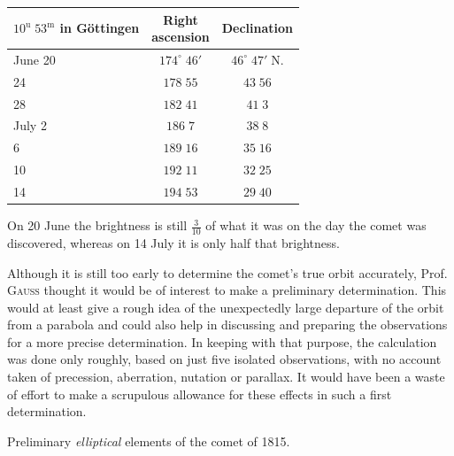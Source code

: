 \begin{center}\fontsize{10}{12}\selectfont\setlength{\tabcolsep}{5pt}\renewcommand{\arraystretch}{1.15}\begin{tabular}{l|c|c}
\shortstack{$10^{\mathrm u}\;53^{\mathrm m}$\\in Göttingen} & \shortstack{Right\\ascension} & Declination\\\hline
June 20 & $174^\circ\;46'$ & $46^\circ\;47'\;\mathrm{N.}$\\
24 & $178\;55$ & $43\;56$\\
28 & $182\;41$ & $41\;3$\\
July 2 & $186\;7$ & $38\;8$\\
6 & $189\;16$ & $35\;16$\\
10 & $192\;11$ & $32\;25$\\
14 & $194\;53$ & $29\;40$\\
\end{tabular}\end{center}

\par\indent On 20 June the brightness is still $\frac{3}{10}$ of what it was on the day the comet was discovered, whereas on 14 July it is only half that brightness.

\par\indent Although it is still too early to determine the comet’s true orbit accurately, Prof. \textsc{Gauss} thought it would be of interest to make a preliminary determination. This would at least give a rough idea of the unexpectedly large departure of the orbit from a parabola and could also help in discussing and preparing the observations for a more precise determination. In keeping with that purpose, the calculation was done only roughly, based on just five isolated observations, with no account taken of precession, aberration, nutation or parallax. It would have been a waste of effort to make a scrupulous allowance for these effects in such a first determination.

\begin{center}
Preliminary \emph{elliptical} elements of the comet of 1815.
\end{center}

